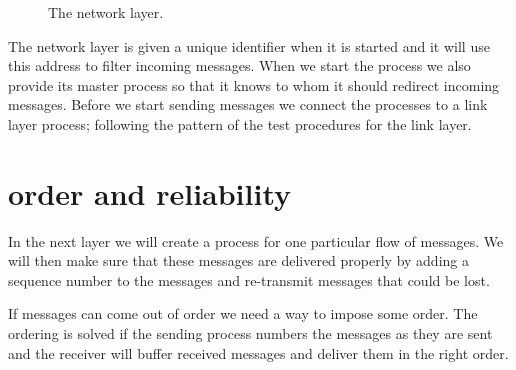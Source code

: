 \documentclass[a4paper,11pt]{article}
\begin{document}
\begin{figure}
\centering  
{}
\caption{The network layer.}
\label{fig:net}
\end{figure}

The network layer is given a unique identifier when it is started and
it will use this address to filter incoming messages. When we start
the process we also provide its master process so that it knows to whom
it should redirect incoming messages. Before we start sending messages
we connect the processes to a link layer process; following the
pattern of the test procedures for the link layer.


\section{order and reliability}

In the next layer we will create a process for one particular flow of
messages. We will then make sure that these messages are delivered
properly by adding a sequence number to the messages and re-transmit
messages that could be lost.

If messages can come out of order we need a way to
impose some order. The ordering is solved if the sending process
numbers the messages as they are sent and the receiver will buffer
received messages and deliver them in the right order. 
\end{document}
